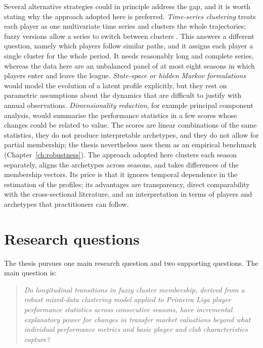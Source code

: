 Several alternative strategies could in principle address the gap, and it is worth stating why the approach adopted here is preferred. \emph{Time-series clustering} treats each player as one multivariate time series and clusters the whole trajectories; fuzzy versions allow a series to switch between clusters \cite{durso2009autocorrelation}. This answers a different question, namely which players follow similar paths, and it assigns each player a single cluster for the whole period. It needs reasonably long and complete series, whereas the data here are an unbalanced panel of at most eight seasons in which players enter and leave the league. \emph{State-space or hidden Markov formulations} would model the evolution of a latent profile explicitly, but they rest on parametric assumptions about the dynamics that are difficult to justify with annual observations. \emph{Dimensionality reduction}, for example principal component analysis, would summarise the performance statistics in a few scores whose changes could be related to value. The scores are linear combinations of the same statistics, they do not produce interpretable archetypes, and they do not allow for partial membership; the thesis nevertheless uses them as an empirical benchmark (Chapter~\ref{ch:robustness}). The approach adopted here clusters each season separately, aligns the archetypes across seasons, and takes differences of the membership vectors. Its price is that it ignores temporal dependence in the estimation of the profiles; its advantages are transparency, direct comparability with the cross-sectional literature, and an interpretation in terms of players and archetypes that practitioners can follow.

\section{Research questions}
\label{sec:lit-questions}

The thesis pursues one main research question and two supporting questions. The main question is:

\begin{quote}
\emph{Do longitudinal transitions in fuzzy cluster membership, derived from a robust mixed-data clustering model applied to Primeira Liga player performance statistics across consecutive seasons, have incremental explanatory power for changes in transfer market valuations beyond what individual performance metrics and basic player and club characteristics capture?}
\end{quote}

